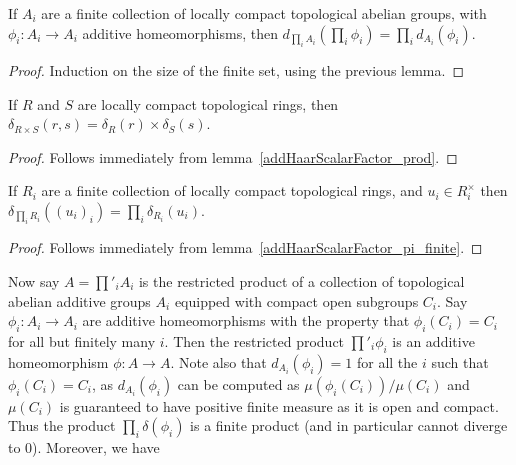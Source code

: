 \begin{lemma}
  \label{addHaarScalarFactor_pi_finite}
  If $A_i$ are a finite collection of locally compact topological abelian groups,
  with $\phi_i:A_i\to A_i$ additive homeomorphisms, then $d_{\prod_i A_i}(\prod_i\phi_i)=\prod_i d_{A_i}(\phi_i)$.
\end{lemma}
\begin{proof}
  Induction on the size of the finite set, using the previous lemma.
\end{proof}

\begin{lemma}
  \label{distribHaarChar_prod}
  If $R$ and $S$ are locally compact topological rings, then $\delta_{R\times S}(r,s)=\delta_R(r)\times\delta_S(s)$.
\end{lemma}
\begin{proof}
  Follows immediately from lemma~\ref{addHaarScalarFactor_prod}.
\end{proof}

\begin{lemma}
  \label{distribHaarChar_pi_finite}
  If $R_i$ are a finite collection of locally compact topological rings,
  and $u_i\in R_i^\times$ then $\delta_{\prod_i R_i}((u_i)_i)=\prod_i\delta_{R_i}(u_i)$.
\end{lemma}
\begin{proof}
  Follows immediately from lemma~\ref{addHaarScalarFactor_pi_finite}.
\end{proof}

Now say $A=\prod'_i A_i$ is the restricted product of a collection of topological abelian additive groups $A_i$
  equipped with compact open subgroups $C_i$. Say $\phi_i:A_i\to A_i$ are additive homeomorphisms
  with the property that $\phi_i(C_i)=C_i$ for all but finitely many $i$. Then the restricted
  product $\prod'_i\phi_i$ is an additive homeomorphism $\phi:A\to A$. Note also that
  $d_{A_i}(\phi_i)=1$ for all the $i$ such that $\phi_i(C_i)=C_i$, as $d_{A_i}(\phi_i)$ can be
  computed as $\mu(\phi_i(C_i))/\mu(C_i)$ and $\mu(C_i)$ is guaranteed to have positive finite measure
  as it is open and compact. Thus the product $\prod_i\delta(\phi_i)$ is a finite product (and in
  particular cannot diverge to $0$). Moreover, we have

